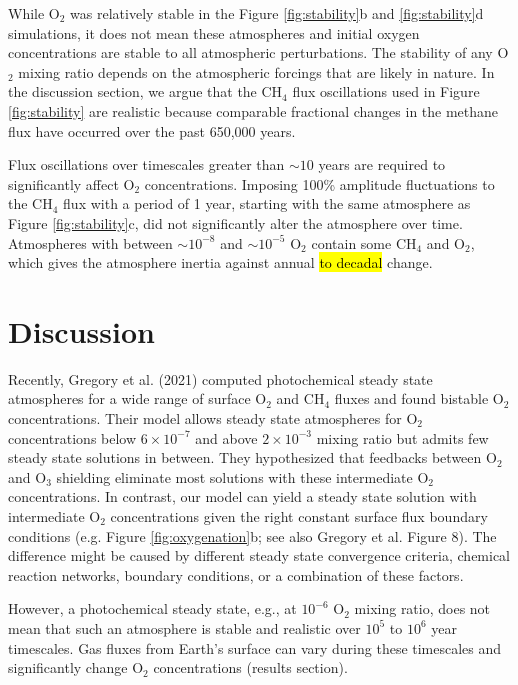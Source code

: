 \documentclass[9pt,twocolumn,twoside,lineno]{pnas-new}
\begin{document}
While O$_2$ was relatively stable in the Figure \ref{fig:stability}b and \ref{fig:stability}d simulations, it does not mean these atmospheres and initial oxygen concentrations are stable to all atmospheric perturbations. The stability of any O$_2$ mixing ratio depends on the atmospheric forcings that are likely in nature. In the discussion section, we argue that the CH$_4$ flux oscillations used in Figure \ref{fig:stability} are realistic because comparable fractional changes in the methane flux have occurred over the past 650,000 years.

Flux oscillations over timescales greater than $\sim10$ years are required to significantly affect O$_2$ concentrations. Imposing 100\% amplitude fluctuations to the CH$_4$ flux with a period of 1 year, starting with the same atmosphere as Figure \ref{fig:stability}c, did not significantly alter the atmosphere over time. Atmospheres with between $\sim10^{-8}$ and $\sim10^{-5}$ O$_2$ contain some CH$_4$ and O$_2$, which gives the atmosphere inertia against annual \hl{to decadal} change.

\section*{Discussion} \label{sec:dis}

Recently, Gregory et al. (2021) \cite{Bethan_2021} computed photochemical steady state atmospheres for a wide range of surface O$_2$ and CH$_4$ fluxes and found bistable O$_2$ concentrations. Their model allows steady state atmospheres for O$_2$ concentrations below $6 \times 10^{-7}$ and above $2 \times 10^{-3}$ mixing ratio but admits few steady state solutions in between. They hypothesized that feedbacks between O$_2$ and O$_3$ shielding eliminate most solutions with these intermediate O$_2$ concentrations. In contrast, our model can yield a steady state solution with intermediate O$_2$ concentrations given the right constant surface flux boundary conditions (e.g. Figure \ref{fig:oxygenation}b; see also Gregory et al. Figure 8). The difference might be caused by different steady state convergence criteria, chemical reaction networks, boundary conditions, or a combination of these factors. 

However, a photochemical steady state, e.g., at $10^{-6}$ O$_2$ mixing ratio, does not mean that such an atmosphere is stable and realistic over $10^5$ to $10^6$ year timescales. Gas fluxes from Earth's surface can vary during these timescales and significantly change O$_2$ concentrations (results section). 
\end{document}
